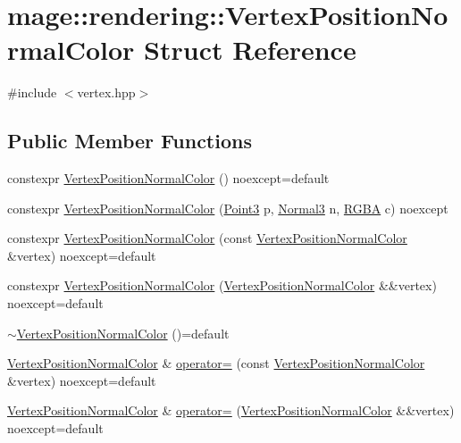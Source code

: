 \hypertarget{structmage_1_1rendering_1_1_vertex_position_normal_color}{}\section{mage\+:\+:rendering\+:\+:Vertex\+Position\+Normal\+Color Struct Reference}
\label{structmage_1_1rendering_1_1_vertex_position_normal_color}


{\ttfamily \#include $<$vertex.\+hpp$>$}

\subsection*{Public Member Functions}
\begin{DoxyCompactItemize}
\item 
constexpr \mbox{\hyperlink{structmage_1_1rendering_1_1_vertex_position_normal_color_af43537af55a5ed53f4828b5e7ea0f5c2}{Vertex\+Position\+Normal\+Color}} () noexcept=default
\item 
constexpr \mbox{\hyperlink{structmage_1_1rendering_1_1_vertex_position_normal_color_aff58865387d88b7aa3b40b76eb476850}{Vertex\+Position\+Normal\+Color}} (\mbox{\hyperlink{structmage_1_1_point3}{Point3}} p, \mbox{\hyperlink{structmage_1_1_normal3}{Normal3}} n, \mbox{\hyperlink{structmage_1_1_r_g_b_a}{R\+G\+BA}} c) noexcept
\item 
constexpr \mbox{\hyperlink{structmage_1_1rendering_1_1_vertex_position_normal_color_ae5112aeadb68fc216e58168600417e31}{Vertex\+Position\+Normal\+Color}} (const \mbox{\hyperlink{structmage_1_1rendering_1_1_vertex_position_normal_color}{Vertex\+Position\+Normal\+Color}} \&vertex) noexcept=default
\item 
constexpr \mbox{\hyperlink{structmage_1_1rendering_1_1_vertex_position_normal_color_ac6247b996c107e6daa2204f98d38b2a9}{Vertex\+Position\+Normal\+Color}} (\mbox{\hyperlink{structmage_1_1rendering_1_1_vertex_position_normal_color}{Vertex\+Position\+Normal\+Color}} \&\&vertex) noexcept=default
\item 
\mbox{\hyperlink{structmage_1_1rendering_1_1_vertex_position_normal_color_af78e3787e0971664a9114cdf4335101c}{$\sim$\+Vertex\+Position\+Normal\+Color}} ()=default
\item 
\mbox{\hyperlink{structmage_1_1rendering_1_1_vertex_position_normal_color}{Vertex\+Position\+Normal\+Color}} \& \mbox{\hyperlink{structmage_1_1rendering_1_1_vertex_position_normal_color_a3357ec7fc8baef5eb34763f38a1e6c1a}{operator=}} (const \mbox{\hyperlink{structmage_1_1rendering_1_1_vertex_position_normal_color}{Vertex\+Position\+Normal\+Color}} \&vertex) noexcept=default
\item 
\mbox{\hyperlink{structmage_1_1rendering_1_1_vertex_position_normal_color}{Vertex\+Position\+Normal\+Color}} \& \mbox{\hyperlink{structmage_1_1rendering_1_1_vertex_position_normal_color_a8b5c89d919ab728771ce1c6c878eb022}{operator=}} (\mbox{\hyperlink{structmage_1_1rendering_1_1_vertex_position_normal_color}{Vertex\+Position\+Normal\+Color}} \&\&vertex) noexcept=default
\end{DoxyCompactItemize}

